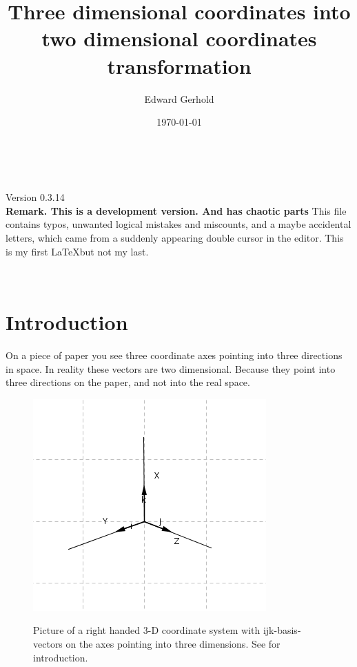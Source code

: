 \documentclass[a4paper]{article}
\begin{document}
\begin{center}
\title{Three dimensional coordinates into two dimensional coordinates transformation}\\
\author{Edward Gerhold}
\date{\today}
\maketitle


Version 0.3.14\\

\textbf{Remark. This is a development version. And has chaotic parts} This file contains typos, unwanted logical mistakes and miscounts, and a maybe accidental letters, which came from a suddenly appearing double cursor in the editor. This is my first \LaTeX but not my last.\\


\end{center} 

\tableofcontents\\

\section{Introduction}

On a piece of paper you see three coordinate axes pointing into three
directions in space. In reality these vectors are two dimensional. Because
they point into three directions on the paper, and not into the real space.\\

\begin{figure}[ht]
\label{ijksystem}
\includegraphics[scale=2]{ijksystem.png}\\
\caption{Picture of a right handed 3-D coordinate system with ijk-basis-vectors on the axes pointing
into three dimensions. See \cite{Corral1} for introduction.}
\end{figure}
\end{document}
